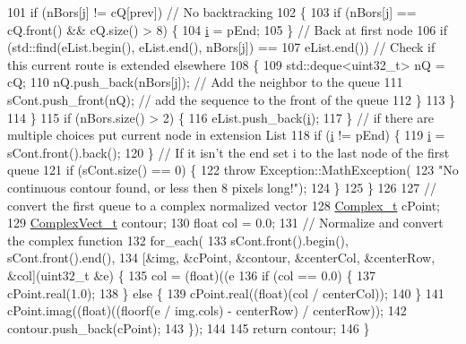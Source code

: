 \begin{DoxyCode}
101       \textcolor{keywordflow}{if} (nBors[\hyperlink{_comparision_pictures_2_createtest_image_8m_ac86694252f8dfdb19aaeadc4b7c342c6}{j}] != cQ[prev]) \textcolor{comment}{// No backtracking}
102       \{
103         \textcolor{keywordflow}{if} (nBors[\hyperlink{_comparision_pictures_2_createtest_image_8m_ac86694252f8dfdb19aaeadc4b7c342c6}{j}] == cQ.front() && cQ.size() > 8) \{
104           \hyperlink{_comparision_pictures_2_createtest_image_8m_a6f6ccfcf58b31cb6412107d9d5281426}{i} = pEnd;
105         \} \textcolor{comment}{// Back at first node}
106         \textcolor{keywordflow}{if} (std::find(eList.begin(), eList.end(), nBors[\hyperlink{_comparision_pictures_2_createtest_image_8m_ac86694252f8dfdb19aaeadc4b7c342c6}{j}]) ==
107             eList.end()) \textcolor{comment}{// Check if this current route is extended elsewhere}
108         \{
109           std::deque<uint32\_t> nQ = cQ;
110           nQ.push\_back(nBors[\hyperlink{_comparision_pictures_2_createtest_image_8m_ac86694252f8dfdb19aaeadc4b7c342c6}{j}]); \textcolor{comment}{// Add the neighbor to the queue}
111           sCont.push\_front(nQ);   \textcolor{comment}{// add the sequence to the front of the queue}
112         \}
113       \}
114     \}
115     \textcolor{keywordflow}{if} (nBors.size() > 2) \{
116       eList.push\_back(\hyperlink{_comparision_pictures_2_createtest_image_8m_a6f6ccfcf58b31cb6412107d9d5281426}{i});
117     \} \textcolor{comment}{// if there are multiple choices put current node in extension List}
118     \textcolor{keywordflow}{if} (\hyperlink{_comparision_pictures_2_createtest_image_8m_a6f6ccfcf58b31cb6412107d9d5281426}{i} != pEnd) \{
119       \hyperlink{_comparision_pictures_2_createtest_image_8m_a6f6ccfcf58b31cb6412107d9d5281426}{i} = sCont.front().back();
120     \} \textcolor{comment}{// If it isn't the end set i to the last node of the first queue}
121     \textcolor{keywordflow}{if} (sCont.size() == 0) \{
122       \textcolor{keywordflow}{throw} Exception::MathException(
123           \textcolor{stringliteral}{"No continuous contour found, or less then 8 pixels long!"});
124     \}
125   \}
126 
127   \textcolor{comment}{// convert the first queue to a complex normalized vector}
128   \hyperlink{_soil_math_types_8h_a26c307796ad803485b0376c90026d8f7}{Complex\_t} cPoint;
129   \hyperlink{_soil_math_types_8h_a7567e521c2b2c408dcb62dbff72390f7}{ComplexVect\_t} contour;
130   \textcolor{keywordtype}{float} col = 0.0;
131   \textcolor{comment}{// Normalize and convert the complex function}
132   for\_each(
133       sCont.front().begin(), sCont.front().end(),
134       [&img, &cPoint, &contour, &centerCol, &centerRow, &col](uint32\_t &e) \{
135         col = (float)((e %
136         \textcolor{keywordflow}{if} (col == 0.0) \{
137           cPoint.real(1.0);
138         \} \textcolor{keywordflow}{else} \{
139           cPoint.real((\textcolor{keywordtype}{float})(col / centerCol));
140         \}
141         cPoint.imag((\textcolor{keywordtype}{float})((floorf(e / img.cols) - centerRow) / centerRow));
142         contour.push\_back(cPoint);
143       \});
144 
145   \textcolor{keywordflow}{return} contour;
146 \}
\end{DoxyCode}



